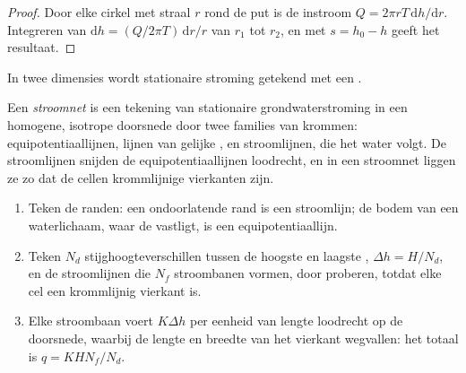 \begin{proof}
Door elke cirkel met straal $r$ rond de put is de instroom $Q = 2\pi r
T\,\mathrm dh/\mathrm dr$. Integreren van $\mathrm dh = (Q/2\pi T)\,\mathrm
dr/r$ van $r_1$ tot $r_2$, en met $s = h_0 - h$ geeft het resultaat.
\end{proof}

In twee dimensies wordt stationaire stroming getekend met een .

\begin{definition}[Stroomnet]\label{def:b3:hydrogeology:flow-net}
Een \emph{stroomnet} is een tekening van stationaire grondwaterstroming in
een homogene, isotrope doorsnede door twee families van krommen: equipotentiaallijnen,
lijnen van gelijke , en stroomlijnen, die het water volgt. De
stroomlijnen snijden de equipotentiaallijnen loodrecht, en in een stroomnet liggen
ze zo dat de cellen krommlijnige vierkanten zijn.
\end{definition}

\begin{method}\label{met:b3:hydrogeology:flow-net}
\leavevmode
\begin{enumerate}
\item Teken de randen: een ondoorlatende rand is een stroomlijn; de bodem van een
  waterlichaam, waar de  vastligt, is een equipotentiaallijn.
\item Teken $N_d$ stijghoogteverschillen tussen de hoogste en laagste , $\Delta h
  = H/N_d$, en de stroomlijnen die $N_f$ stroombanen vormen, door proberen,
  totdat elke cel een krommlijnig vierkant is.
\item Elke stroombaan voert $K\Delta h$ per eenheid van lengte loodrecht op de
  doorsnede, waarbij de lengte en breedte van het vierkant wegvallen: het totaal is $q =
  KHN_f/N_d$.
\end{enumerate}
\end{method}

